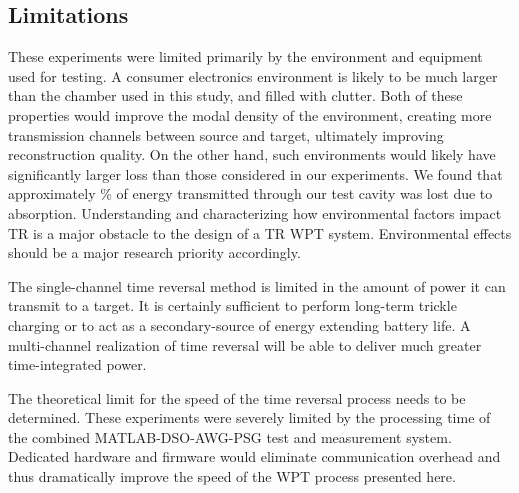 \subsection{Limitations}
\label{sec:limitations}


These experiments were limited primarily by the environment and equipment used
for testing.
%
A consumer electronics environment is likely to be much larger than the chamber
used in this study, and filled with clutter.
%
Both of these properties would improve the modal density of the environment,
creating more transmission channels between source and target, ultimately
improving reconstruction quality.
%
On the other hand, such environments would likely have significantly larger loss
than those considered in our experiments. We found that approximately \% of energy transmitted through our test cavity was lost due to absorption. Understanding and characterizing how environmental factors impact TR is a major obstacle to the design of a TR WPT system. Environmental effects should be a major research priority accordingly.


The single-channel time reversal method is limited in the amount of power it can
transmit to a target.
%
It is certainly sufficient to perform long-term trickle charging or to act as a
secondary-source of energy extending battery life.
%
A multi-channel realization of time reversal will be able to deliver much
greater time-integrated power.



The theoretical limit for the speed of the time reversal process needs to be
determined.
%
These experiments were severely limited by the processing time of the combined
MATLAB-DSO-AWG-PSG test and measurement system.
%
Dedicated hardware and firmware would eliminate communication overhead and thus
dramatically improve the speed of the WPT process presented here.
